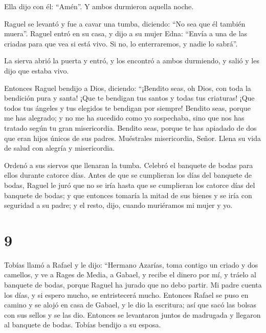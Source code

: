  Ella dijo con él: ``Amén''. Y ambos durmieron aquella
noche.

 Raguel se levantó y fue a cavar una tumba,
 diciendo: ``No sea que él también muera''.
 Raguel entró en su casa,  y dijo a su
mujer Edna: ``Envía a una de las criadas para que vea si está vivo. Si
no, lo enterraremos, y nadie lo sabrá''.

 La sierva abrió la puerta y entró, y los encontró a
ambos durmiendo,  y salió y les dijo que estaba vivo.

 Entonces Raguel bendijo a Dios, diciendo: ``¡Bendito
seas, oh Dios, con toda la bendición pura y santa! ¡Que te bendigan tus
santos y todas tus criaturas! ¡Que todos tus ángeles y tus elegidos te
bendigan por siempre!  Bendito seas, porque me has
alegrado; y no me ha sucedido como yo sospechaba, sino que nos has
tratado según tu gran misericordia.  Bendito seas, porque
te has apiadado de dos que eran hijos únicos de sus padres. Muéstrales
misericordia, Señor. Llena su vida de salud con alegría y misericordia.

 Ordenó a sus siervos que llenaran la tumba.
 Celebró el banquete de bodas para ellos durante catorce
días.  Antes de que se cumplieran los días del banquete
de bodas, Raguel le juró que no se iría hasta que se cumplieran los
catorce días del banquete de bodas;  y que entonces
tomaría la mitad de sus bienes y se iría con seguridad a su padre; y el
resto, dijo, cuando muriéramos mi mujer y yo.

\hypertarget{section-8}{%
\section{9}\label{section-8}}

 Tobías llamó a Rafael y le dijo:  ``Hermano
Azarías, toma contigo un criado y dos camellos, y ve a Rages de Media, a
Gabael, y recibe el dinero por mí, y tráelo al banquete de bodas,
 porque Raguel ha jurado que no debo partir.
 Mi padre cuenta los días, y si espero mucho, se
entristecerá mucho.  Entonces Rafael se puso en camino y
se alojó en casa de Gabael, y le dio la escritura; así que sacó las
bolsas con sus sellos y se las dio.  Entonces se
levantaron juntos de madrugada y llegaron al banquete de bodas. Tobías
bendijo a su esposa.

